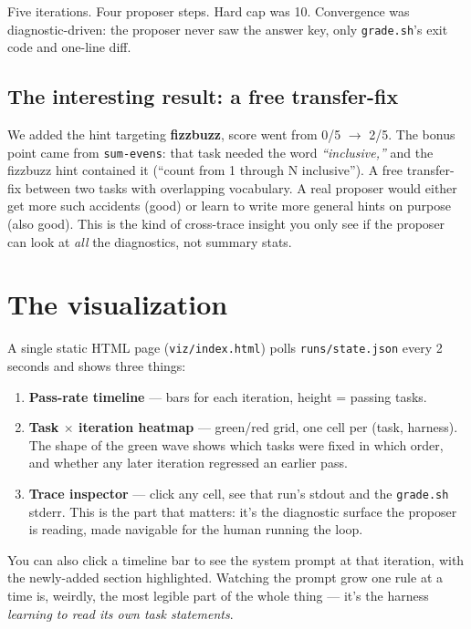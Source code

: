 \documentclass[11pt]{article}
\begin{document}
Five iterations. Four proposer steps. Hard cap was 10. Convergence was
diagnostic-driven: the proposer never saw the answer key, only
\texttt{grade.sh}'s exit code and one-line diff.

\subsection*{The interesting result: a free transfer-fix}

We added the hint targeting \textbf{fizzbuzz}, score went from 0/5 $\to$
2/5. The bonus point came from \texttt{sum-evens}: that task needed the
word \emph{``inclusive,''} and the fizzbuzz hint contained it (``count from
1 through N inclusive''). A free transfer-fix between two tasks with
overlapping vocabulary. A real proposer would either get more such accidents
(good) or learn to write more general hints on purpose (also good). This is
the kind of cross-trace insight you only see if the proposer can look at
\emph{all} the diagnostics, not summary stats.

\section*{The visualization}

A single static HTML page (\texttt{viz/index.html}) polls
\texttt{runs/state.json} every 2 seconds and shows three things:

\begin{enumerate}[leftmargin=1.2em,itemsep=0.15em]
  \item \textbf{Pass-rate timeline} --- bars for each iteration, height = passing tasks.
  \item \textbf{Task $\times$ iteration heatmap} --- green/red grid, one cell per
        (task, harness). The shape of the green wave shows which tasks were
        fixed in which order, and whether any later iteration regressed an
        earlier pass.
  \item \textbf{Trace inspector} --- click any cell, see that run's stdout and
        the \texttt{grade.sh} stderr. This is the part that matters: it's the
        diagnostic surface the proposer is reading, made navigable for the
        human running the loop.
\end{enumerate}

You can also click a timeline bar to see the system prompt at that iteration,
with the newly-added section highlighted. Watching the prompt grow one rule
at a time is, weirdly, the most legible part of the whole thing --- it's the
harness \emph{learning to read its own task statements}.
\end{document}
